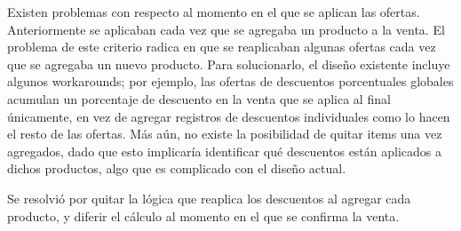 \documentclass[a4paper,11pt]{article}
\begin{document}
Existen problemas con respecto al momento en el que se aplican las ofertas.
Anteriormente se aplicaban cada vez que se agregaba un producto a la venta.  El
problema de este criterio radica en que se reaplicaban algunas ofertas cada vez
que se agregaba un nuevo producto. Para solucionarlo, el diseño existente
incluye algunos workarounds; por ejemplo, las ofertas de descuentos
porcentuales globales acumulan un porcentaje de descuento en la venta que se
aplica al final únicamente, en vez de agregar registros de descuentos
individuales como lo hacen el resto de las ofertas. Más aún, no existe la
posibilidad de quitar items una vez agregados, dado que esto implicaría
identificar qué descuentos están aplicados a dichos productos, algo que es
complicado con el diseño actual.

Se resolvió por quitar la lógica que reaplica los descuentos al agregar cada
producto, y diferir el cálculo al momento en el que se confirma la venta.
\end{document}
